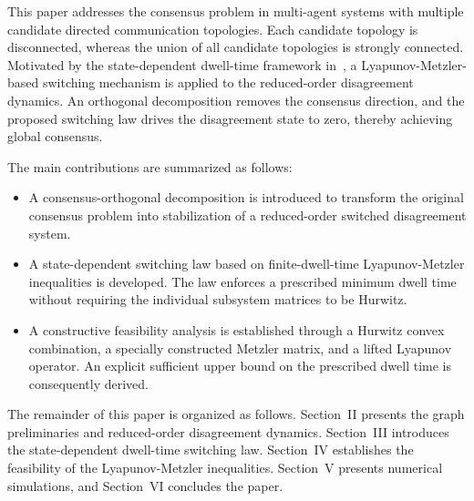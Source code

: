 \documentclass[conference]{IEEEtran}
\begin{document}
	This paper addresses the consensus problem in multi-agent systems with multiple
	candidate directed communication topologies. Each candidate topology
	is disconnected, whereas the union of all candidate topologies is
	strongly connected. Motivated by the state-dependent dwell-time
	framework in~\cite{russo2025}, a Lyapunov-Metzler-based switching
	mechanism is applied to the reduced-order disagreement dynamics. An
	orthogonal decomposition removes the consensus direction, and the
	proposed switching law drives the disagreement state to zero, thereby
	achieving global consensus.
	
	The main contributions are summarized as follows:
	\begin{itemize}
		\item A consensus-orthogonal decomposition is introduced to
		transform the original consensus problem into stabilization of a
		reduced-order switched disagreement system.
		
		\item A state-dependent switching law based on finite-dwell-time
		Lyapunov-Metzler inequalities is developed. The law enforces a
		prescribed minimum dwell time without requiring the individual
		subsystem matrices to be Hurwitz.
		
		\item A constructive feasibility analysis is established through
		a Hurwitz convex combination, a specially constructed Metzler
		matrix, and a lifted Lyapunov operator. An explicit sufficient
		upper bound on the prescribed dwell time is consequently derived.
	\end{itemize}
	
	The remainder of this paper is organized as follows. Section~II
	presents the graph preliminaries and reduced-order disagreement
	dynamics. Section~III introduces the state-dependent dwell-time
	switching law. Section~IV establishes the feasibility of the
	Lyapunov-Metzler inequalities. Section~V presents numerical
	simulations, and Section~VI concludes the paper.
	
\end{document}
